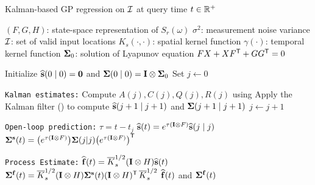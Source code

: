 \documentclass[10pt]{article}
\numberwithin{equation}{section}
\begin{document}
\begin{algorithm}
    \caption{Kalman-based GP regression on $\calI$ at query time $t \in \bbR^{+}$}
    \label{alg:todescato-kalman-GP}

    \begin{spacing}{1.1}
    \begin{algorithmic}[1]
        \Require 
            \Statex \hspace{\algorithmicindent} $(F,G,H)$: state-space representation of $S_r(\omega)$
            \Statex \hspace{\algorithmicindent} $\sigma^2$: measurement noise variance
            \Statex \hspace{\algorithmicindent} $\calI$: set of valid input locations
            \Statex \hspace{\algorithmicindent} $K_s(\cdot,\cdot)$: spatial kernel function
            \Statex \hspace{\algorithmicindent} $\gamma(\cdot)$: temporal kernel function
            \Statex \hspace{\algorithmicindent} $\bm{\Sigma}_0$: solution of Lyapunov equation $FX+XF^{\scriptstyle{\mathsf{T}}}+GG^{\scriptstyle{\mathsf{T}}}=0$

        \State Initialize $\widehat{\mathbf{s}}(0\mid 0) = \mathbf{0}$ and $\bm{\Sigma}(0\mid 0)=\mathbf{I}\otimes\bm{\Sigma}_0$
        \State Set $j \gets 0$

        \Statex \texttt{Kalman estimates:}
            \State Compute $A(j), C(j), Q(j), R(j)$ using 
            \State Apply the Kalman filter () to compute $\widehat{\mathbf{s}}(j+1 \mid j+1)$ and $\bm{\Sigma}(j+1 \mid j+1)$
            \State $j \gets j+1$
        \EndWhile 

        \Statex \texttt{Open-loop prediction:}
        \State $\tau = t - t_j$
        \State $\widehat{\mathbf{s}}(t) = e^{\tau(\mathbf{I} \otimes F)}\widehat{\mathbf{s}}(j \mid j)$
        \State $\bm{\Sigma}^{\mathbf{s}}(t) = \big(e^{\tau(\mathbf{I} \otimes F)}\big)\bm{\Sigma}(j|j)\big(e^{\tau(\mathbf{I} \otimes F)}\big)^{\scriptstyle{\mathsf{T}}}$

        \Statex \texttt{Process Estimate:}
        \State $\widehat{\mathbf{f}}(t) = \overline{K}_{s}^{1/2}(\mathbf{I} \otimes H)\widehat{\mathbf{s}}(t)$
        \State $\bm{\Sigma}^{\mathbf{f}}(t) = \overline{K}_{s}^{1/2}(\mathbf{I} \otimes H)\bm{\Sigma}^{\mathbf{s}}(t)(\mathbf{I} \otimes H)^{\scriptstyle{\mathsf{T}}}\,\overline{K}_{s}^{1/2}$
        \State \Return $\widehat{\mathbf{f}}(t)$ and $\bm{\Sigma}^{\mathbf{f}}(t)$
    \end{algorithmic}
    \end{spacing}
\end{algorithm}
\end{document}
